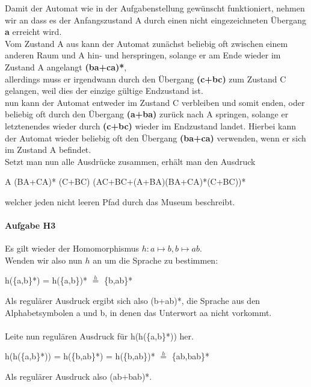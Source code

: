 \documentclass[11pt]{article}
\begin{document}
\begin{center}
\end{center}	
Damit der Automat wie in der Aufgabenstellung gewünscht funktioniert, nehmen wir an dass es der Anfangszustand A durch einen nicht eingezeichneten Übergang \textbf{a} erreicht wird.
\\Vom Zustand A aus kann der Automat zunächst beliebig oft zwischen einem anderen Raum und A hin- und herspringen, solange er am Ende wieder im Zustand A angelangt \textbf{(ba+ca)*},
\\allerdings muss er irgendwann durch den Übergang \textbf{(c+bc)} zum Zustand C gelangen, weil dies der einzige gültige Endzustand ist.
\\nun kann der Automat entweder im Zustand C verbleiben und somit enden, oder
\\beliebig oft durch den Übergang \textbf{(a+ba)} zurück nach A springen, solange er letztenendes wieder durch \textbf{(c+bc)} wieder im Endzustand landet. Hierbei kann der Automat wieder beliebig oft den Übergang \textbf{(ba+ca)} verwenden, wenn er sich im Zustand A befindet.
\\Setzt man nun alle Ausdrücke zusammen, erhält man den Ausdruck
\begin{center}
A (BA+CA)* (C+BC) (AC+BC+(A+BA)(BA+CA)*(C+BC))*
\end{center}
welcher jeden nicht leeren Pfad durch das Museum beschreibt.

\paragraph{Aufgabe H3}
Es gilt wieder der Homomorphismus $h:a \mapsto b, b \mapsto ab$.
\\Wenden wir also nun $h$ an um die Sprache zu bestimmen: 
\begin{center}
h(\{a,b\}*) = h(\{a,b\})* $\overset{h}{=}$ \{b,ab\}*
\end{center}
Als regulärer Ausdruck ergibt sich also (b+ab)*, die Sprache aus den Alphabetsymbolen a und b, in denen das Unterwort aa nicht vorkommt. 
\\ \\Leite nun regulären Ausdruck für h(h(\{a,b\}*)) her. 
\begin{center}
h(h(\{a,b\}*)) = h(\{b,ab\}*) = h(\{b,ab\})* $\overset{h}{=}$ \{ab,bab\}*
\end{center}
Als regulärer Ausdruck also (ab+bab)*.
\end{document}
